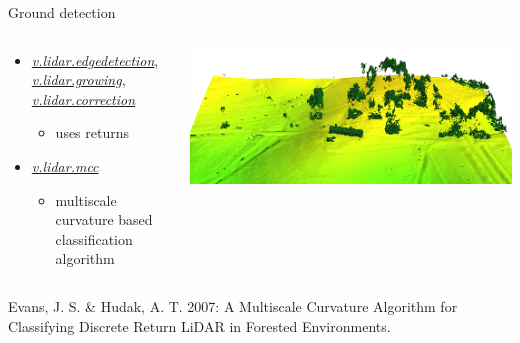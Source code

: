 \documentclass[xcolor={dvipsnames,usenames},beamer,aspectratio=169]{beamer}
\newcommand{\gmodule}[1]{\href{http://grass.osgeo.org/grass71/manuals/#1.html}{\emph{#1}}}
\newcommand{\amodule}[1]{\href{http://grass.osgeo.org/grass70/manuals/addons/#1.html}{\emph{#1}}}
\begin{document}
\begin{frame}{Ground detection}

\begin{columns}
\begin{column}{0.35\textwidth}

\begin{itemize}
\item \gmodule{v.lidar.edgedetection}, \gmodule{v.lidar.growing}, \gmodule{v.lidar.correction}
\begin{itemize}
  \item uses returns
\end{itemize}

\item \amodule{v.lidar.mcc}
\begin{itemize}
  \item multiscale curvature based classification algorithm\footnotemark[1]
\end{itemize}

\end{itemize}

\end{column}
\begin{column}{0.64\textwidth}

\begin{center}
  \includegraphics[width=\textwidth]{grass/mcc_default}
\end{center}

\end{column}
\end{columns}

\bigskip

\footnoterule
\footnotesize
\footnotemark[1]
Evans, J. S. \& Hudak, A. T. 2007: A Multiscale Curvature Algorithm for Classifying Discrete Return LiDAR in Forested Environments.

\end{frame}
\end{document}
